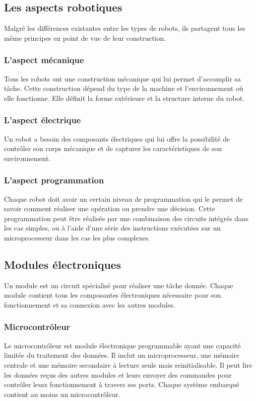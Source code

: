 \subsection{Les aspects robotiques}

Malgré les différences existantes entre les types de robots, ils partagent tous
les même principes en point de vue de leur construction.

\subsubsection{L'aspect mécanique}

Tous les robots ont une construction mécanique qui lui permet d'accomplir sa
tâche. Cette construction dépend du type de la machine et l'environnement où
elle fonctionne. Elle définit la forme extérieure et la structure interne du
robot.

\subsubsection{L'aspect électrique}

Un robot a besoin des composants électriques qui lui offre la possibilité de
contrôler son corps mécanique et de capturer les caractéristiques de son
environnement.

\subsubsection{L'aspect programmation}

Chaque robot doit avoir un certain niveau de programmation qui le permet de
savoir comment réaliser une opération ou prendre une décision. Cette
programmation peut être réalisée par une combinaison des circuits intégrés dans
les cas simples, ou à l'aide d'une série des instructions exécutées sur un
microprocesseur dans les cas les plus complexes.

\subsection{Modules électroniques}
Un module est un circuit spécialisé pour réaliser une tâche donnée. Chaque
module contient tous les composantes électroniques nécessaire pour son
fonctionnement et sa connexion avec les autres modules.

\subsubsection{Microcontrôleur}
Le microcontrôleur est module électronique programmable ayant une capacité
limitée du traitement des données. Il inclut un microprocesseur, une mémoire
centrale et une mémoire secondaire à lecture seule mais reinitialisable.
Il peut lire les données reçus des autres modules et leurs envoyer des commandes
pour contrôler leurs fonctionnement à travers ses ports. Chaque système embarqué
contient au moins un microcontrôleur.

